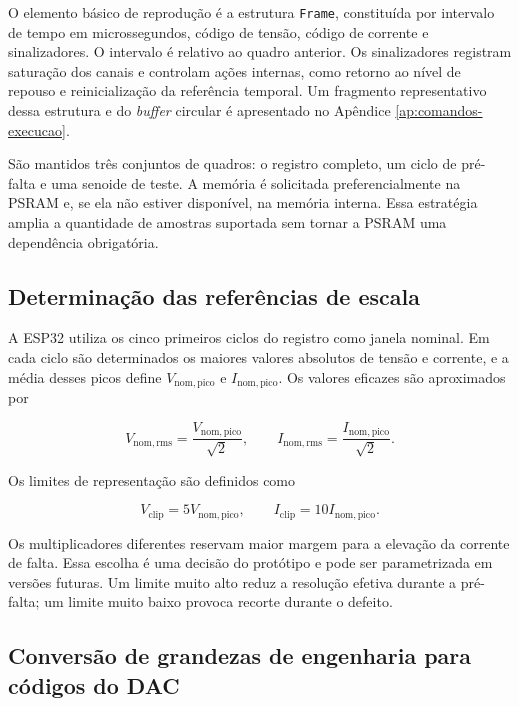 O elemento básico de reprodução é a estrutura \texttt{Frame}, constituída por intervalo de tempo em microssegundos, código de tensão, código de corrente e sinalizadores. O intervalo é relativo ao quadro anterior. Os sinalizadores registram saturação dos canais e controlam ações internas, como retorno ao nível de repouso e reinicialização da referência temporal. Um fragmento representativo dessa estrutura e do \textit{buffer} circular é apresentado no Apêndice \ref{ap:comandos-execucao}.

São mantidos três conjuntos de quadros: o registro completo, um ciclo de pré-falta e uma senoide de teste. A memória é solicitada preferencialmente na PSRAM e, se ela não estiver disponível, na memória interna. Essa estratégia amplia a quantidade de amostras suportada sem tornar a PSRAM uma dependência obrigatória.

\subsection{Determinação das referências de escala}

A ESP32 utiliza os cinco primeiros ciclos do registro como janela nominal. Em cada ciclo são determinados os maiores valores absolutos de tensão e corrente, e a média desses picos define $V_{\mathrm{nom,pico}}$ e $I_{\mathrm{nom,pico}}$. Os valores eficazes são aproximados por

\begin{equation}
  V_{\mathrm{nom,rms}}=\frac{V_{\mathrm{nom,pico}}}{\sqrt{2}}, \qquad
  I_{\mathrm{nom,rms}}=\frac{I_{\mathrm{nom,pico}}}{\sqrt{2}}.
\end{equation}

Os limites de representação são definidos como

\begin{equation}
  V_{\mathrm{clip}}=5V_{\mathrm{nom,pico}}, \qquad
  I_{\mathrm{clip}}=10I_{\mathrm{nom,pico}}.
  \label{eq:limites-dac}
\end{equation}

Os multiplicadores diferentes reservam maior margem para a elevação da corrente de falta. Essa escolha é uma decisão do protótipo e pode ser parametrizada em versões futuras. Um limite muito alto reduz a resolução efetiva durante a pré-falta; um limite muito baixo provoca recorte durante o defeito.

\subsection{Conversão de grandezas de engenharia para códigos do DAC}


